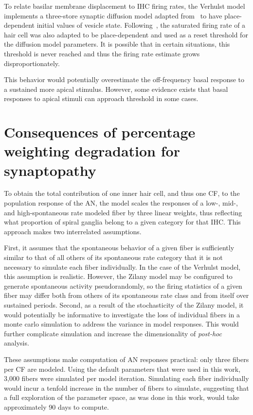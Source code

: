 To relate basilar membrane displacement to IHC firing rates, the Verhulst model implements a three-store synaptic diffusion model adapted from~\cite{Westerman1988Diffusion} to have place-dependent initial values of vesicle state.   Following~\cite{Liberman1978AuditoryNerve}, the saturated firing rate of a hair cell was also adapted to be place-dependent and used as a reset threshold for the diffusion model parameters.  It is possible that in certain situations, this threshold is never reached and thus the firing rate estimate grows disproportionately.  

This behavior would potentially overestimate the off-frequency basal response to a sustained more apical stimulus.  However, some evidence exists \citep{Kiang1974Tails,Yates1990Basilar} that basal responses to apical stimuli can approach threshold in some cases. 

\section{Consequences of percentage weighting degradation for synaptopathy} %
\label{sec:consequences_of_percentage_weighting_degradation_for_synaptopathy}
To obtain the total contribution of one inner hair cell, and thus one CF, to the population response of the AN, the model scales the responses of a low-, mid-, and high-spontaneous rate modeled fiber by three linear weights, thus reflecting what proportion of spiral ganglia belong to a given category for that IHC.  This approach makes two interrelated assumptions.  

First, it assumes that the spontaneous behavior of a given fiber is sufficiently similar to that of all others of its spontaneous rate category that it is not necessary to simulate each fiber individually.  In the case of the Verhulst model, this assumption is realistic.  However, the Zilany model may be configured to generate spontaneous activity pseudorandomly, so the firing statistics of a given fiber may differ both from others of its spontaneous rate class and from itself over sustained periods.  Second, as a result of the stochasticity of the Zilany model, it would potentially be informative to investigate the loss of individual fibers in a monte carlo simulation to address the variance in model responses.  This would further complicate simulation and increase the dimensionality of \emph{post-hoc} analysis. 

These assumptions make computation of AN responses practical: only three fibers per CF are modeled.  Using the default parameters that were used in this work, 3,000 fibers were simulated per model iteration.  Simulating each fiber individually would incur a tenfold increase in the number of fibers to simulate, suggesting that a full exploration of the parameter space, as was done in this work, would take approximately 90 days to compute.  

